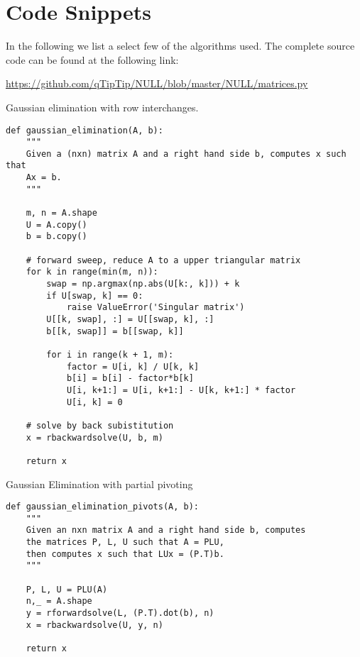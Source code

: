 \documentclass[oneside, a4paper, 12pt, article]{memoir}
\begin{document}
    \appendix

    \chapter{Code Snippets}
    
    In the following we list a select few of the algorithms used.
    The complete source code can be found at
    the following link: \\
    \begin{centering}
        \url{https://github.com/qTipTip/NULL/blob/master/NULL/matrices.py} 
    \end{centering}

    \begin{listing}
        \caption{Gaussian elimination with row interchanges.}
    \begin{verbatim}
def gaussian_elimination(A, b):
    """ 
    Given a (nxn) matrix A and a right hand side b, computes x such that
    Ax = b. 
    """
    
    m, n = A.shape
    U = A.copy() 
    b = b.copy()

    # forward sweep, reduce A to a upper triangular matrix
    for k in range(min(m, n)):
        swap = np.argmax(np.abs(U[k:, k])) + k
        if U[swap, k] == 0:
            raise ValueError('Singular matrix')
        U[[k, swap], :] = U[[swap, k], :]
        b[[k, swap]] = b[[swap, k]]
        
        for i in range(k + 1, m):
            factor = U[i, k] / U[k, k]
            b[i] = b[i] - factor*b[k]
            U[i, k+1:] = U[i, k+1:] - U[k, k+1:] * factor
            U[i, k] = 0
    
    # solve by back subistitution
    x = rbackwardsolve(U, b, m)

    return x 
    \end{verbatim}
    \end{listing}

    \begin{listing}
        \caption{Gaussian Elimination with partial pivoting}
    \begin{verbatim}
def gaussian_elimination_pivots(A, b):
    """
    Given an nxn matrix A and a right hand side b, computes
    the matrices P, L, U such that A = PLU,
    then computes x such that LUx = (P.T)b.
    """

    P, L, U = PLU(A)
    n,_ = A.shape
    y = rforwardsolve(L, (P.T).dot(b), n)
    x = rbackwardsolve(U, y, n)

    return x         
    \end{verbatim}
    \end{listing}
\end{document}
